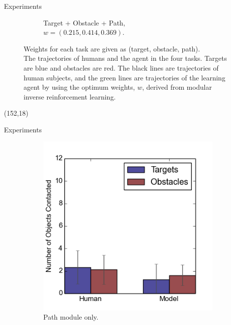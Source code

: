 \documentclass[final]{beamer}
\begin{document}
\begin{frame}{}
\begin{textblock}{69}
\begin{block}{Experiments}
\begin{figure}[h]
\begin{subfigure}[b]{0.47\textwidth}
\caption{Target + Obstacle + Path, \\$w = (0.215, 0.414, 0.369)$. }
\end{subfigure}
\caption{Weights for each task are given as (target,
obstacle, path).\\
The trajectories of humans and the agent in the four tasks. Targets are blue and obstacles are red. The
black lines are trajectories of human subjects, and the green lines are
trajectories of the learning agent by using the optimum weights, $w$, derived
from modular inverse reinforcement learning. }
\label{fig:exp}
\end{figure}

\end{block}
\end{textblock}

\begin{textblock}{86}(152,18)
\begin{block}{Experiments}
\begin{figure}[h]
\centering
\begin{subfigure}[b]{0.24\textwidth}
\includegraphics[width=\textwidth]{contact1.png}
\caption{Path module only.}
\end{subfigure}
\begin{subfigure}[b]{0.24\textwidth}

\end{subfigure}
\end{figure}
\end{block}
\end{textblock}
\end{frame}
\end{document}
